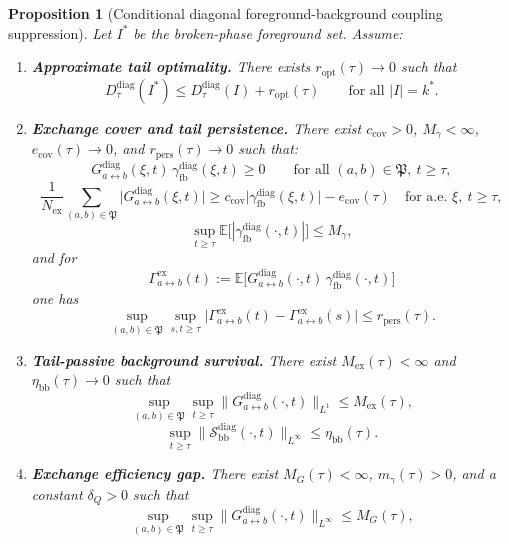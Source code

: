 \documentclass[12pt]{article}
\newtheorem{proposition}[theorem]{Proposition}
\theoremstyle{definition}
\theoremstyle{remark}
\begin{document}
\begin{proposition}[Conditional diagonal foreground-background coupling suppression]\label{prop:conditional_b2a}
Let \(I^*\) be the broken-phase foreground set. Assume:
\begin{enumerate}
\item \textbf{Approximate tail optimality.} There exists
  \(r_{\mathrm{opt}}(\tau)\to 0\) such that
  \[
  D_\tau^{\mathrm{diag}}(I^*)
  \le
  D_\tau^{\mathrm{diag}}(I)+r_{\mathrm{opt}}(\tau)
  \qquad
  \text{for all } |I|=k^*.
  \]
\item \textbf{Exchange cover and tail persistence.} There exist
  \(c_{\mathrm{cov}}>0\), \(M_\gamma<\infty\),
  \(e_{\mathrm{cov}}(\tau)\to 0\), and
  \(r_{\mathrm{pers}}(\tau)\to 0\) such that:
  \[
  G_{a\leftrightarrow b}^{\mathrm{diag}}(\xi,t)\,
  \gamma_{\mathrm{fb}}^{\mathrm{diag}}(\xi,t)\ge 0
  \qquad
  \text{for all } (a,b)\in\mathfrak P,\ t\ge\tau,
  \]
  \[
  \frac{1}{N_{\mathrm{ex}}}
  \sum_{(a,b)\in\mathfrak P}
  \bigl|
  G_{a\leftrightarrow b}^{\mathrm{diag}}(\xi,t)
  \bigr|
  \ge
  c_{\mathrm{cov}}
  \bigl|
  \gamma_{\mathrm{fb}}^{\mathrm{diag}}(\xi,t)
  \bigr|
  -
  e_{\mathrm{cov}}(\tau)
  \quad
  \text{for a.e. } \xi,\ t\ge\tau,
  \]
  \[
  \sup_{t\ge\tau}
  \mathbb E\!\bigl[
  |\gamma_{\mathrm{fb}}^{\mathrm{diag}}(\cdot,t)|
  \bigr]
  \le
  M_\gamma,
  \]
  and for
  \[
  \Gamma_{a\leftrightarrow b}^{\mathrm{ex}}(t)
  :=
  \mathbb E\!\bigl[
  G_{a\leftrightarrow b}^{\mathrm{diag}}(\cdot,t)\,
  \gamma_{\mathrm{fb}}^{\mathrm{diag}}(\cdot,t)
  \bigr]
  \]
  one has
  \[
  \sup_{(a,b)\in\mathfrak P}
  \sup_{s,t\ge\tau}
  \bigl|
  \Gamma_{a\leftrightarrow b}^{\mathrm{ex}}(t)
  -
  \Gamma_{a\leftrightarrow b}^{\mathrm{ex}}(s)
  \bigr|
  \le
  r_{\mathrm{pers}}(\tau).
  \]
\item \textbf{Tail-passive background survival.} There exist
  \(M_{\mathrm{ex}}(\tau)<\infty\) and
  \(\eta_{\mathrm{bb}}(\tau)\to 0\) such that
  \[
  \sup_{(a,b)\in\mathfrak P}\sup_{t\ge\tau}
  \bigl\|
  G_{a\leftrightarrow b}^{\mathrm{diag}}(\cdot,t)
  \bigr\|_{L^1}
  \le
  M_{\mathrm{ex}}(\tau),
  \]
  \[
  \sup_{t\ge\tau}
  \bigl\|
  \mathcal S_{\mathrm{bb}}^{\mathrm{diag}}(\cdot,t)
  \bigr\|_{L^\infty}
  \le
  \eta_{\mathrm{bb}}(\tau).
  \]
\item \textbf{Exchange efficiency gap.} There exist
  \(M_G(\tau)<\infty\), \(m_\gamma(\tau)>0\), and a constant
  \(\delta_Q>0\) such that
  \[
  \sup_{(a,b)\in\mathfrak P}\sup_{t\ge\tau}
  \bigl\|
  G_{a\leftrightarrow b}^{\mathrm{diag}}(\cdot,t)
  \bigr\|_{L^\infty}
  \le
  M_G(\tau),
\]
\end{enumerate}
\end{proposition}
\end{document}
